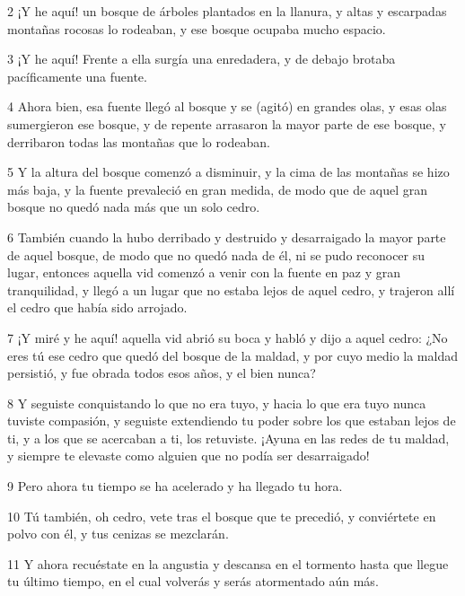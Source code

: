 \par 2 ¡Y he aquí! un bosque de árboles plantados en la llanura, y altas y escarpadas montañas rocosas lo rodeaban, y ese bosque ocupaba mucho espacio.

\par 3 ¡Y he aquí! Frente a ella surgía una enredadera, y de debajo brotaba pacíficamente una fuente.

\par 4 Ahora bien, esa fuente llegó al bosque y se (agitó) en grandes olas, y esas olas sumergieron ese bosque, y de repente arrasaron la mayor parte de ese bosque, y derribaron todas las montañas que lo rodeaban.

\par 5 Y la altura del bosque comenzó a disminuir, y la cima de las montañas se hizo más baja, y la fuente prevaleció en gran medida, de modo que de aquel gran bosque no quedó nada más que un solo cedro.

\par 6 También cuando la hubo derribado y destruido y desarraigado la mayor parte de aquel bosque, de modo que no quedó nada de él, ni se pudo reconocer su lugar, entonces aquella vid comenzó a venir con la fuente en paz y gran tranquilidad, y llegó a un lugar que no estaba lejos de aquel cedro, y trajeron allí el cedro que había sido arrojado.

\par 7 ¡Y miré y he aquí! aquella vid abrió su boca y habló y dijo a aquel cedro: ¿No eres tú ese cedro que quedó del bosque de la maldad, y por cuyo medio la maldad persistió, y fue obrada todos esos años, y el bien nunca?

\par 8 Y seguiste conquistando lo que no era tuyo, y hacia lo que era tuyo nunca tuviste compasión, y seguiste extendiendo tu poder sobre los que estaban lejos de ti, y a los que se acercaban a ti, los retuviste. ¡Ayuna en las redes de tu maldad, y siempre te elevaste como alguien que no podía ser desarraigado!

\par 9 Pero ahora tu tiempo se ha acelerado y ha llegado tu hora.

\par 10 Tú también, oh cedro, vete tras el bosque que te precedió, y conviértete en polvo con él, y tus cenizas se mezclarán.

\par 11 Y ahora recuéstate en la angustia y descansa en el tormento hasta que llegue tu último tiempo, en el cual volverás y serás atormentado aún más.

